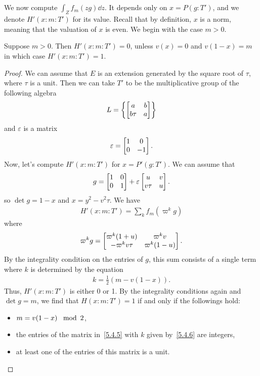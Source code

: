 \subsection{}
We now compute $\int_Z f_m(zg) \dd z$.
It depends only on $x = P(g:T')$, and we denote $H'(x:m:T')$ for its value.
Recall that by definition, $x$ is a norm, meaning that the valuation of $x$ is even.
We begin with the case $m > 0$.
\begin{proposition}\label{prop:5.4}
    Suppose $m > 0$.
    Then $H'(x:m:T')=0$, unless $v(x) = 0$ and $v(1-x)=m$ in which case $H'(x:m:T')=1$.
\end{proposition}
\begin{proof}
We can assume that $E$ is an extension generated by the square root of $\tau$, where $\tau$ is a unit.
Then we can take $T'$ to be the multiplicative group of the following algebra
\begin{align}
    L = \left\{\begin{bmatrix} a & b \\ b\tau & a \end{bmatrix}\right\}
\end{align}
and $\varepsilon$ is a matrix
\begin{align}
    \varepsilon = \begin{bmatrix} 1 & 0 \\ 0 & -1 \end{bmatrix}.
\end{align}
Now, let's compute $H'(x:m:T')$ for $x = P'(g:T')$.
We can assume that 
\begin{align}
    g = \begin{bmatrix} 1 & 0 \\ 0 & 1 \end{bmatrix} + \varepsilon \begin{bmatrix} u & v \\ v\tau & u \end{bmatrix}.
\end{align}
so $\det g = 1 - x$ and $x = y^2 - v^2 \tau$.
We have
\begin{align}
    H'(x:m:T') = \sum_{k}f_{m}(\varpi^k g)
\end{align}
where
\begin{align}
    \label{5.4.5}
    \varpi^k g = \begin{bmatrix} \varpi^k(1+u) & \varpi^k v \\ -\varpi^k v\tau & \varpi^k(1-u) \end{bmatrix}.
\end{align}
By the integrality condition on the entries of $g$, this sum consists of a single term where $k$ is determined by the equation
\begin{align}
    \label{5.4.6}
    k = \frac{1}{2}(m - v(1-x)).
\end{align}
Thus, $H'(x:m:T')$ is either 0 or 1.
By the integrality conditions again and $\det g = m$, we find that $H(x:m:T') = 1$ if and only if the followings hold:
\begin{itemize}
    \item $m = v(1-x) \,\mathrm{\mod}\,2$,
    \item the entries of the matrix in~\eqref{5.4.5} with $k$ given by~\eqref{5.4.6} are integers,
    \item at least one of the entries of this matrix is a unit.

\end{itemize}
\end{proof}
